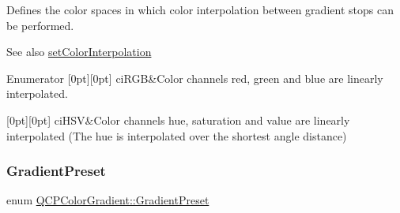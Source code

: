 Defines the color spaces in which color interpolation between gradient stops can be performed.

\begin{DoxySeeAlso}{See also}
\mbox{\hyperlink{class_q_c_p_color_gradient_aa13fda86406e1d896a465a409ae63b38}{set\+Color\+Interpolation}} 
\end{DoxySeeAlso}
\begin{DoxyEnumFields}{Enumerator}
[0pt][0pt]{}\mbox{\label{class_q_c_p_color_gradient_ac5dca17cc24336e6ca176610e7f77fc1a5e30f725c9cfe93999e268a9f92afbe7}} 
ci\+R\+GB&Color channels red, green and blue are linearly interpolated. \\
\hline

[0pt][0pt]{}\mbox{\label{class_q_c_p_color_gradient_ac5dca17cc24336e6ca176610e7f77fc1af14ae62fcae11ecc07234eeaec5856cb}} 
ci\+H\+SV&Color channels hue, saturation and value are linearly interpolated (The hue is interpolated over the shortest angle distance) \\
\hline

\end{DoxyEnumFields}
\mbox{\label{class_q_c_p_color_gradient_aed6569828fee337023670272910c9072}} 
\subsubsection{\texorpdfstring{GradientPreset}{GradientPreset}}
{\footnotesize\ttfamily enum \mbox{\hyperlink{class_q_c_p_color_gradient_aed6569828fee337023670272910c9072}{Q\+C\+P\+Color\+Gradient\+::\+Gradient\+Preset}}}

